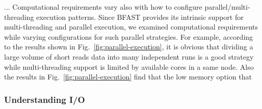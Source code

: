 \documentclass{acm_proc_article-sp}
\begin{document}
...  Computational requirements vary also with
how to configure parallel/multi-threading execution patterns.  Since
BFAST provides its intrinsic support for multi-threading and parallel
execution, we examined computational requirements while varying
configurations for such parallel strategies.  For example, according
to the results shown in Fig.~\ref{fig:parallel-execution}, it is
obvious that dividing a large volume of short reads data into many
independent runs is a good strategy while multi-threading support is
limited by available cores in a same node.  Also the results in
Fig.~\ref{fig:parallel-execution} find that the low memory option that




\subsubsection{Understanding I/O}
\end{document}
